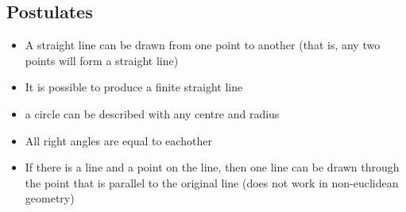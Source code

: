 \documentclass[a4paper,10pt]{report}
\begin{document}
\subsection{Postulates}
\begin{itemize}
	\item A straight line can be drawn from one point to another (that is, any two points will form a straight line)
	\item It is possible to produce a finite straight line
	\item a circle can be described with any centre and radius
	\item All right angles are equal to eachother
	\item If there is a line and a point on the line, then one line can be drawn through the point that is parallel to the original line (does not work in non-euclidean geometry)
\end{itemize}
\end{document}

